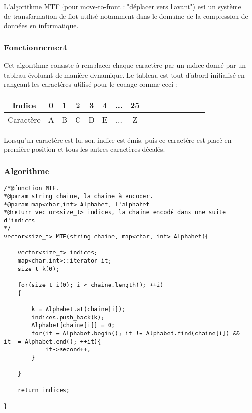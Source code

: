 \par L'algorithme MTF (pour move-to-front : "déplacer vers l'avant") est un système de transformation de flot utilisé notamment dans le domaine de la compression de données en informatique. 

\subsubsection{Fonctionnement}
\par Cet algorithme consiste à remplacer chaque caractère par un indice donné par un tableau évoluant de manière dynamique. 
Le tableau est tout d'abord initialisé en rangeant les caractères utilisé pour le codage comme ceci : \\

\begin{tabular}{|c|c|c|c|c|c|c|c|c|c|c|c|c|c|c|c|}
    \hline
    Indice & 0 & 1 & 2 & 3 & 4 & ... & 25\\
    \hline
    Caractère & A & B & C & D & E & ... & Z\\
    \hline
\end{tabular}

\par Lorsqu'un caractère est lu, son indice est émis, puis ce caractère est placé en première position et tous les autres caractères décalés.

\subsubsection{Algorithme}
\begin{verbatim}
/*@function MTF.
*@param string chaine, la chaine à encoder.
*@param map<char,int> Alphabet, l'alphabet.
*@return vector<size_t> indices, la chaine encodé dans une suite d'indices.
*/
vector<size_t> MTF(string chaine, map<char, int> Alphabet){
	
    vector<size_t> indices;
    map<char,int>::iterator it;
    size_t k(0);

    for(size_t i(0); i < chaine.length(); ++i)
    {
	
	    k = Alphabet.at(chaine[i]);
	    indices.push_back(k);
	    Alphabet[chaine[i]] = 0;
	    for(it = Alphabet.begin(); it != Alphabet.find(chaine[i]) && it != Alphabet.end(); ++it){
		    it->second++;
		}
			
    }
	
    return indices;
	
}
\end{verbatim}



